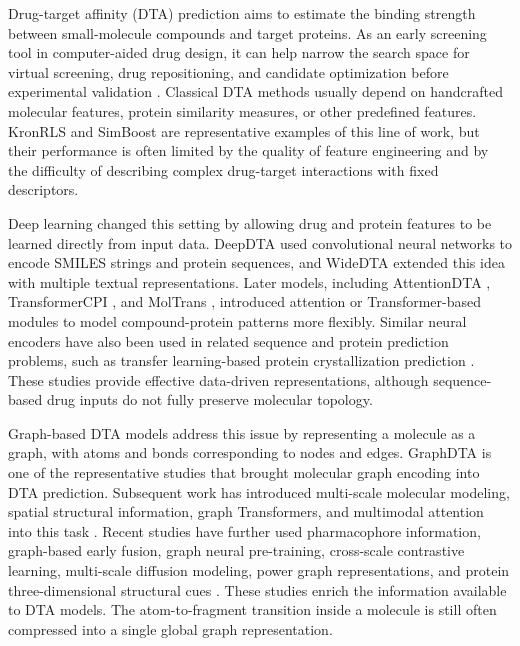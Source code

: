 \documentclass[pdflatex,sn-mathphys-num]{sn-jnl}%
\theoremstyle{thmstyleone}%
\theoremstyle{thmstyletwo}%
\theoremstyle{thmstylethree}%
\begin{document}
Drug-target affinity (DTA) prediction aims to estimate the binding strength between small-molecule compounds and target proteins. As an early screening tool in computer-aided drug design, it can help narrow the search space for virtual screening, drug repositioning, and candidate optimization before experimental validation \cite{ozturk2018deepdta}. Classical DTA methods usually depend on handcrafted molecular features, protein similarity measures, or other predefined features. KronRLS \cite{pahikkala2015toward} and SimBoost \cite{He2017SimBoost} are representative examples of this line of work, but their performance is often limited by the quality of feature engineering and by the difficulty of describing complex drug-target interactions with fixed descriptors.

Deep learning changed this setting by allowing drug and protein features to be learned directly from input data. DeepDTA \cite{ozturk2018deepdta} used convolutional neural networks to encode SMILES strings and protein sequences, and WideDTA \cite{ozturk2019widedta} extended this idea with multiple textual representations. Later models, including AttentionDTA \cite{zhao2023attentiondta}, TransformerCPI \cite{chen2020transformercpi}, and MolTrans \cite{huang2021moltrans}, introduced attention or Transformer-based modules to model compound-protein patterns more flexibly. Similar neural encoders have also been used in related sequence and protein prediction problems, such as transfer learning-based protein crystallization prediction \cite{jin2022tlcrys}. These studies provide effective data-driven representations, although sequence-based drug inputs do not fully preserve molecular topology.

Graph-based DTA models address this issue by representing a molecule as a graph, with atoms and bonds corresponding to nodes and edges. GraphDTA \cite{nguyen2021graphdta} is one of the representative studies that brought molecular graph encoding into DTA prediction. Subsequent work has introduced multi-scale molecular modeling, spatial structural information, graph Transformers, and multimodal attention into this task \cite{yang2022mgraphdta,jiang2022sequence,wu2024attentionmgtdta}. Recent studies have further used pharmacophore information, graph-based early fusion, graph neural pre-training, cross-scale contrastive learning, multi-scale diffusion modeling, power graph representations, and protein three-dimensional structural cues \cite{zhang2023gpcndta,liu2024geformerdta,ye2024graphpre,qi2024extendedgraph,wang2024crossscale,zhu2024multiscale,hu2025powergraph,hou2025megdta}. These studies enrich the information available to DTA models. The atom-to-fragment transition inside a molecule is still often compressed into a single global graph representation.
\end{document}

